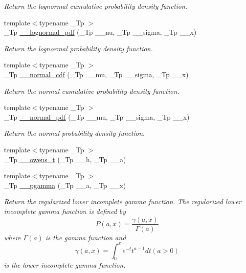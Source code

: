 \begin{DoxyCompactItemize}
\begin{DoxyCompactList}\small\item\em Return the lognormal cumulative probability density function. \end{DoxyCompactList}\item 
{\footnotesize template$<$typename \+\_\+\+Tp $>$ }\\\+\_\+\+Tp \hyperlink{namespacestd_1_1____detail_a46c5dea7a38f38965bce5a84d389a02b}{\+\_\+\+\_\+lognormal\+\_\+pdf} (\+\_\+\+Tp \+\_\+\+\_\+nu, \+\_\+\+Tp \+\_\+\+\_\+sigma, \+\_\+\+Tp \+\_\+\+\_\+x)
\begin{DoxyCompactList}\small\item\em Return the lognormal probability density function. \end{DoxyCompactList}\item 
{\footnotesize template$<$typename \+\_\+\+Tp $>$ }\\\+\_\+\+Tp \hyperlink{namespacestd_1_1____detail_a718b0f0884f0bc91b038ef4dabbb7427}{\+\_\+\+\_\+normal\+\_\+cdf} (\+\_\+\+Tp \+\_\+\+\_\+mu, \+\_\+\+Tp \+\_\+\+\_\+sigma, \+\_\+\+Tp \+\_\+\+\_\+x)
\begin{DoxyCompactList}\small\item\em Return the normal cumulative probability density function. \end{DoxyCompactList}\item 
{\footnotesize template$<$typename \+\_\+\+Tp $>$ }\\\+\_\+\+Tp \hyperlink{namespacestd_1_1____detail_a6211a0741c8e2dfb219fb52d072295f4}{\+\_\+\+\_\+normal\+\_\+pdf} (\+\_\+\+Tp \+\_\+\+\_\+mu, \+\_\+\+Tp \+\_\+\+\_\+sigma, \+\_\+\+Tp \+\_\+\+\_\+x)
\begin{DoxyCompactList}\small\item\em Return the normal probability density function. \end{DoxyCompactList}\item 
{\footnotesize template$<$typename \+\_\+\+Tp $>$ }\\\+\_\+\+Tp \hyperlink{namespacestd_1_1____detail_a5b50a9d8beaca5a637c8293ab01bf124}{\+\_\+\+\_\+owens\+\_\+t} (\+\_\+\+Tp \+\_\+\+\_\+h, \+\_\+\+Tp \+\_\+\+\_\+a)
\item 
{\footnotesize template$<$typename \+\_\+\+Tp $>$ }\\\+\_\+\+Tp \hyperlink{namespacestd_1_1____detail_a009273f90a2496eb24abf92cd957b851}{\+\_\+\+\_\+pgamma} (\+\_\+\+Tp \+\_\+\+\_\+a, \+\_\+\+Tp \+\_\+\+\_\+x)
\begin{DoxyCompactList}\small\item\em Return the regularized lower incomplete gamma function. The regularized lower incomplete gamma function is defined by \[ P(a,x) = \frac{\gamma(a,x)}{\Gamma(a)} \] where $ \Gamma(a) $ is the gamma function and \[ \gamma(a,x) = \int_0^x e^{-t}t^{a-1}dt (a > 0) \] is the lower incomplete gamma function. \end{DoxyCompactList}\item 

\end{DoxyCompactItemize}
